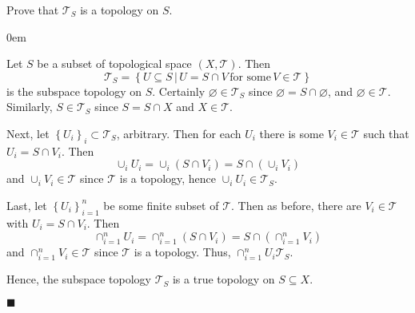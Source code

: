\documentclass[12pt]{article}
\renewcommand{\qed}{\hfill$\blacksquare$}
\renewenvironment{proof}{\begin{addmargin}[1em]{0em}\begin{newproof}}{\end{newproof}\end{addmargin}\qed}
\newenvironment{exercise}[2][Exercise]{\begin{trivlist}
\item[\hskip \labelsep {\bfseries #1}\hskip \labelsep {\bfseries #2.}]}{\end{trivlist}}
\begin{document}
\begin{exercise}{3.1}
Prove that $\mathcal{T}_S$ is a topology on $S$.
\end{exercise}
\begin{proof}
Let $S$ be a subset of topological space $\left(X,\mathcal{T}\right)$. Then $$\mathcal{T}_S = \left\{ U\subseteq S \, | \, U=S\cap V \, \text{for some} \, V\in \mathcal{T}\right\}$$ is the subspace topology on $S$. Certainly $\varnothing\in \mathcal{T}_S$ since $\varnothing = S\cap \varnothing$, and $\varnothing \in \mathcal{T}$. Similarly, $S\in \mathcal{T}_S$ since $S=S\cap X$ and $X \in \mathcal{T}$.

Next, let $\left\{U_i\right\}_i \subset \mathcal{T}_S$, arbitrary. Then for each $U_i$ there is some $V_i\in \mathcal{T}$ such that $U_i = S\cap V_i$. Then $$ \cup_i U_i = \cup_i \left(S\cap V_i\right) = S \cap \left( \cup_i V_i\right) $$ and $\cup_i V_i \in \mathcal{T}$ since $\mathcal{T}$ is a topology, hence $\cup_i U_i \in \mathcal{T}_S$.

Last, let $\left\{U_i\right\}_{i=1}^n$ be some finite subset of $\mathcal{T}$. Then as before, there are $V_i \in \mathcal{T}$ with $U_i = S\cap V_i$. Then
$$ \cap_{i=1}^n U_i = \cap_{i=1}^n \left(S\cap V_i\right) = S\cap \left(\cap_{i=1}^n V_i\right) $$ and $\cap_{i=1}^n V_i \in \mathcal{T}$ since $\mathcal{T}$ is a topology. Thus, $\cap_{i=1}^n U_i \mathcal{T}_S$.

Hence, the subspace topology $\mathcal{T}_S$ is a true topology on $S\subseteq X$.
\end{proof}
\end{document}

